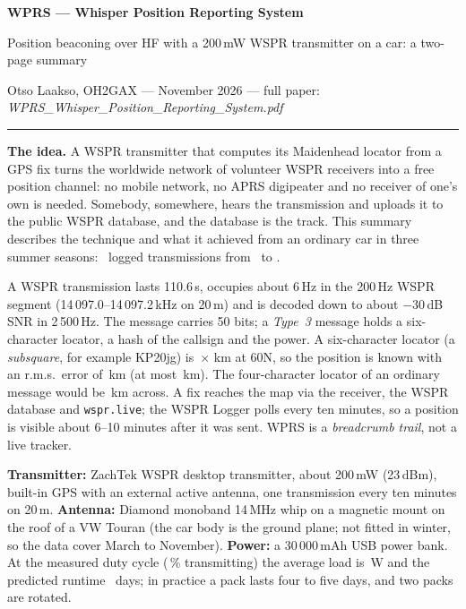 \documentclass[10pt,a4paper]{article}
\renewcommand{\makeheader}[3]{%
  \begin{center}
    {\Large\bfseries #1\par}\vspace{2pt}
    {\normalsize #2\par}\vspace{4pt}
    {\small Otso Laakso, OH2GAX \quad---\quad #3\par}
  \end{center}\vspace{0pt}\hrule\vspace{4pt}}
\newcommand{\hd}[1]{\par\vspace{5pt}{\large\bfseries\color{accent}#1}\par\vspace{1pt}}
\begin{document}
\makeheader{WPRS --- Whisper Position Reporting System}{Position beaconing over HF with a 200\,mW WSPR transmitter on a car: a two-page summary}{7 November 2026 --- full paper: \emph{WPRS\_Whisper\_Position\_Reporting\_System.pdf}}

\textbf{The idea.} A WSPR transmitter that computes its Maidenhead locator from a GPS fix turns the worldwide network of volunteer WSPR receivers into a free position channel: no mobile network, no APRS digipeater and no receiver of one's own is needed. Somebody, somewhere, hears the transmission and uploads it to the public WSPR database, and the database is the track. This summary describes the technique and what it achieved from an ordinary car in three summer seasons: \wFixes\ logged transmissions from \wFirst\ to \wLast.

\hd{How it works}
A WSPR transmission lasts 110.6\,s, occupies about 6\,Hz in the 200\,Hz WSPR segment (14\,097.0--14\,097.2\,kHz on 20\,m) and is decoded down to about $-30$\,dB SNR in 2\,500\,Hz. The message carries 50 bits; a \emph{Type~3} message holds a six-character locator, a hash of the callsign and the power. A six-character locator (a \emph{subsquare}, for example KP20jg) is \wSqNS\,$\times$\,\wSqEW\,km at 60\textdegree N, so the position is known with an r.m.s.\ error of \wRMS\,km (at most \wHalfDiag\,km). The four-character locator of an ordinary message would be \wSqFourNS\,km across. A fix reaches the map via the receiver, the WSPR database and \texttt{wspr.live}; the WSPR Logger polls every ten minutes, so a position is visible about 6--10 minutes after it was sent. WPRS is a \emph{breadcrumb trail}, not a live tracker.

\hd{Station}
\textbf{Transmitter:} ZachTek WSPR desktop transmitter, about 200\,mW (23\,dBm), built-in GPS with an external active antenna, one transmission every ten minutes on 20\,m. \textbf{Antenna:} Diamond monoband 14\,MHz whip on a magnetic mount on the roof of a VW Touran (the car body is the ground plane; not fitted in winter, so the data cover March to November). \textbf{Power:} a 30\,000\,mAh USB power bank. At the measured duty cycle (\wTxFrac\,\% transmitting) the average load is \eAvgW\,W and the predicted runtime \eDays\ days; in practice a pack lasts four to five days, and two packs are rotated.
\end{document}

